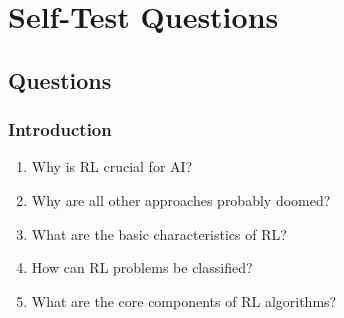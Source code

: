 \chapter{Self-Test Questions}
	\section{Questions}
		\subsection{Introduction}
			\begin{enumerate}
				\item Why is \ac{RL} crucial for \ac{AI}?
				\item Why are all other approaches probably doomed?
				\item What are the basic characteristics of \ac{RL}?
				\item How can \ac{RL} problems be classified?
				\item What are the core components of \ac{RL} algorithms?
			\end{enumerate}

